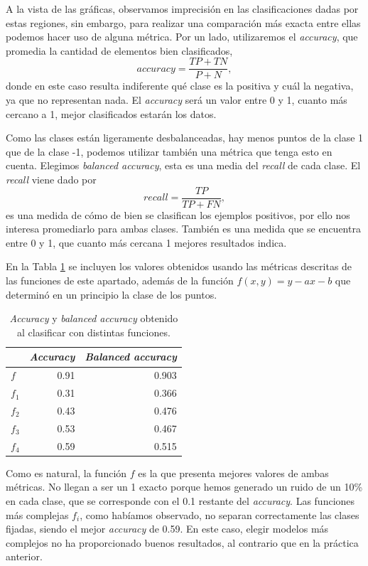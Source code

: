 \documentclass[a4paper, 20pt]{article}
\begin{document}
A la vista de las gráficas, observamos imprecisión en las clasificaciones dadas por estas regiones, sin embargo, para realizar una comparación más exacta entre ellas podemos hacer uso de alguna métrica. Por un lado, utilizaremos el \textit{accuracy}, que promedia la cantidad de elementos bien clasificados,\[
accuracy = \frac{TP + TN}{P + N},
\]
donde en este caso resulta indiferente qué clase es la positiva y cuál la negativa, ya que no representan nada. El \textit{accuracy} será un valor entre 0 y 1, cuanto más cercano a 1, mejor clasificados estarán los datos.

Como las clases están ligeramente desbalanceadas, hay menos puntos de la clase 1 que de la clase -1, podemos utilizar también una métrica que tenga esto en cuenta. Elegimos \textit{balanced accuracy}, esta es una media del \textit{recall} de cada clase. El \textit{recall} viene dado por \[
recall = \frac{TP}{TP+FN},
\]
es una medida de cómo de bien se clasifican los ejemplos positivos, por ello nos interesa promediarlo para ambas clases. También es una medida que se encuentra entre 0 y 1, que cuanto más cercana 1 mejores resultados indica.

En la Tabla \ref{tab:13} se incluyen los valores obtenidos usando las métricas descritas de las funciones de este apartado, además de la función $f(x,y) = y -ax -b$ que determinó en un principio la clase de los puntos.

\begin{table}[H]
\large
\centering
\caption{\textit{Accuracy} y \textit{balanced accuracy} obtenido al clasificar con distintas funciones.}
\label{tab:13}
\begin{tabular}{lrr}
\toprule
& \textit{Accuracy} & \textit{Balanced accuracy}\\ \midrule
$f$ & 0.91 & 0.903\\
$f_1$ & 0.31 & 0.366\\
$f_2$ & 0.43 & 0.476\\
$f_3$ & 0.53 & 0.467\\
$f_4$ & 0.59 & 0.515\\
\bottomrule
\end{tabular}
\end{table}

Como es natural, la función $f$ es la que presenta mejores valores de ambas métricas. No llegan a ser un 1 exacto porque hemos generado un ruido de un 10\% en cada clase, que se corresponde con el 0.1 restante del \textit{accuracy}. Las funciones más complejas $f_i$, como habíamos observado, no separan correctamente las clases fijadas, siendo el mejor \textit{accuracy} de 0.59. En este caso, elegir modelos más complejos no ha proporcionado buenos resultados, al contrario que en la práctica anterior.
\end{document}
